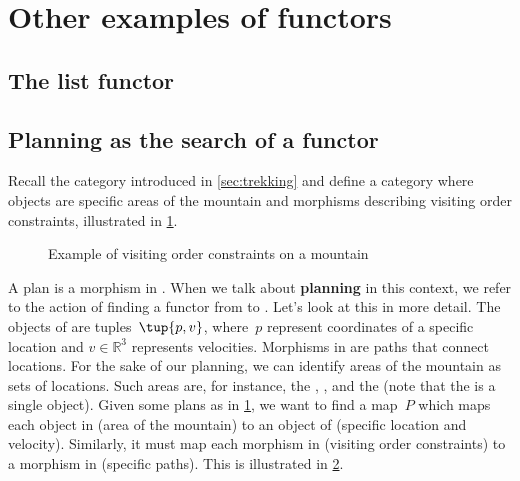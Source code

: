 \section{Other examples of functors}

\subsection{The list functor}


\subsection{Planning as the search of a functor}
\begin{example}
  Recall the category \Berg introduced in \cref{sec:trekking} and define a category \Plans where objects are specific areas of the mountain and morphisms describing visiting order constraints, illustrated in \cref{fig:visiting_order_constraints}.


  \begin{figure}[h]
    \begin{center}
    \end{center}
    \caption{Example of visiting order constraints on a mountain}
    \label{fig:visiting_order_constraints}
  \end{figure}
  A plan is a morphism in \Plans. When we talk about \textbf{planning} in this context, we refer to the action of finding a functor from \Plans to \Berg. Let's look at this in more detail. The objects of \Berg are tuples~$\tup{p,v}$, where~$p$ represent coordinates of a specific location and $v\in \mathbb{R}^3$ represents velocities. Morphisms in \Berg are paths that connect locations. For the sake of our planning, we can identify areas of the mountain as sets of locations. Such areas are, for instance, the , , and the  (note that the  is a single object). Given some plans as in \cref{fig:visiting_order_constraints}, we want to find a map~$P$ which maps each object in \Plans (area of the mountain) to an object of \Berg (specific location and velocity). Similarly, it must map each morphism in \Plans (visiting order constraints) to a morphism in \Berg (specific paths). This is illustrated in \cref{fig:plans_functor}.
\end{example}

\begin{figure}
  \centering
  \caption{}
  \label{fig:plans_functor}
\end{figure}

